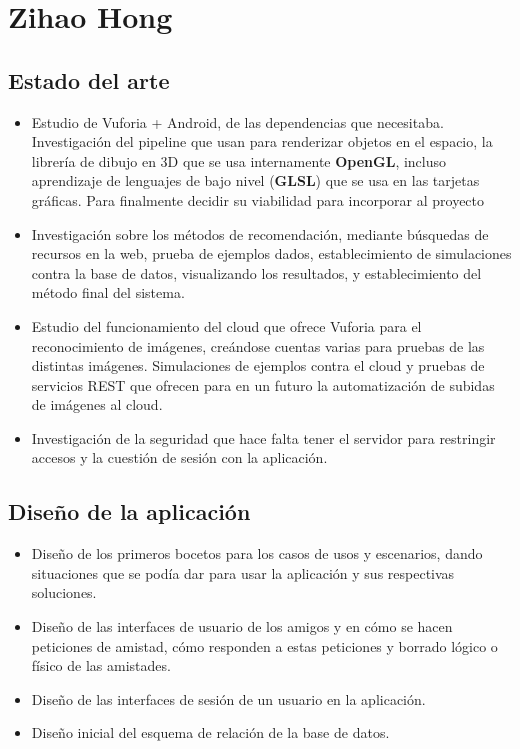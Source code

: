 \section{Zihao Hong}
\label{makereference7.4}
    \subsection{Estado del arte}
    \label{makereference7.4.1}
        \begin{itemize}
            \item Estudio de Vuforia + Android, de las dependencias que necesitaba. Investigación del pipeline 
            que usan para renderizar objetos en el espacio, la librería de dibujo en 3D que se usa internamente \textbf{OpenGL}, 
            incluso aprendizaje de lenguajes de bajo nivel (\textbf{GLSL}) que se usa en las tarjetas gráficas. Para finalmente 
            decidir su viabilidad para incorporar al proyecto
            \item Investigación sobre los métodos de recomendación, mediante búsquedas de recursos en la web, prueba de 
            ejemplos dados, establecimiento de simulaciones contra la base de datos, visualizando los resultados, y establecimiento 
            del método final del sistema.
            \item Estudio del funcionamiento del cloud que ofrece Vuforia para el reconocimiento de imágenes, creándose cuentas varias 
            para pruebas de las distintas imágenes. Simulaciones de ejemplos contra el cloud y pruebas de servicios REST que ofrecen para 
            en un futuro la automatización de subidas de imágenes al cloud.
            \item Investigación de la seguridad que hace falta tener el servidor para restringir accesos y la cuestión de sesión con la aplicación.
        \end{itemize}
    \subsection{Diseño de la aplicación}
    \label{makereference7.4.2}
        \begin{itemize}
            \item Diseño de los primeros bocetos para los casos de usos y escenarios, dando situaciones que se 
            podía dar para usar la aplicación y sus respectivas soluciones.
            \item Diseño de las interfaces de usuario de los amigos y en cómo se hacen peticiones de amistad, cómo responden a estas peticiones y
            borrado lógico o físico de las amistades.
            \item Diseño de las interfaces de sesión de un usuario en la aplicación.
            \item Diseño inicial del esquema de relación de la base de datos.
        \end{itemize}
